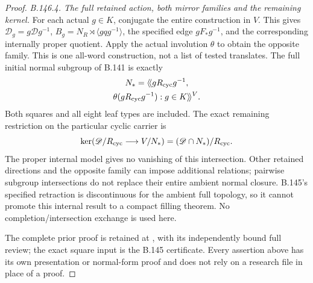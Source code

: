 \begin{proof}
\emph{B.146.4. The full retained action, both mirror families and the remaining kernel.}
For each actual $g\in K$, conjugate the entire construction in
$V$. This gives $\mathscr D_g=g\mathscr Dg^{-1}$,
$B_g=N_R\rtimes\langle gqg^{-1}\rangle$, the specified edge
$gF_*g^{-1}$, and the corresponding internally proper quotient.
Apply the actual involution $\theta$ to obtain the opposite
family. This is one all-word construction, not a list of tested
translates. The full initial normal subgroup of B.141 is exactly
\begin{equation}\label{eq:B146-full-normal}
\begin{gathered}
 N_*=\langle\!\langle gR_{\rm cyc}g^{-1},\\
          \theta(gR_{\rm cyc}g^{-1}):g\in K
                       \rangle\!\rangle^V.
\end{gathered}
\end{equation}
Both squares and all eight leaf types are included. The exact
remaining restriction on the particular cyclic carrier is
\begin{equation}\label{eq:B146-ambient-kernel}
 \ker(\mathscr D/R_{\rm cyc}\longrightarrow V/N_*)
          =(\mathscr D\cap N_*)/R_{\rm cyc}.
\end{equation}
The proper internal model gives no vanishing of this intersection.
Other retained directions and the opposite family can impose
additional relations; pairwise subgroup intersections do not
replace their entire ambient normal closure. B.145's specified
retraction is discontinuous for the ambient full topology, so it
cannot promote this internal result to a compact filling theorem.
No completion/intersection exchange is used here.

The complete prior proof is retained at
,
with its independently bound full review; the exact square input
is the B.145 certificate. Every assertion above has its own
presentation or normal-form proof and does not rely on a research
file in place of a proof.
\end{proof}
